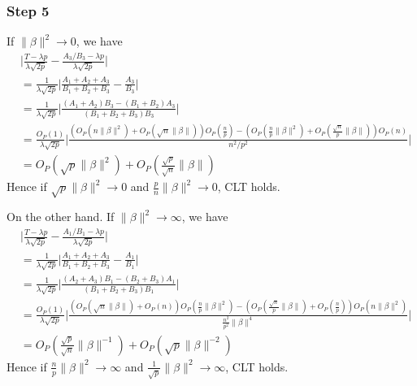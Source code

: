 \documentclass[review]{elsarticle}
\theoremstyle{plain}
\theoremstyle{definition}
\theoremstyle{remark}
\begin{document}
\subsubsection{Step 5}

If $\|\beta\|^2\to 0$, we have
\begin{equation}
    \begin{aligned}
        &\Big|\frac{T-{\lambda p}}{\lambda\sqrt{2p}
        }-
    \frac{A_3/B_3-{\lambda p}}{\lambda\sqrt{2p}
        }\Big|\\
        &=
        \frac{1}{\lambda\sqrt{2p}}
        \Big|
        \frac{A_1+A_2+A_3}{B_1+B_2+B_3}-\frac{A_3}{B_3}
        \Big|\\
        &=
        \frac{1}{\lambda\sqrt{2p}}
        \Big|
        \frac{(A_1+A_2)B_3-(B_1+B_2)A_3}{(B_1+B_2+B_3)B_3}
        \Big|\\
        &=
        \frac{O_{P}(1)}{\lambda\sqrt{2p}}
        \Big|
        \frac{(O_P(n\|\beta\|^2)+O_P(\sqrt{n}\|\beta\|))O_P(\frac{n}{p})-(O_P(\frac{n}{p}\|\beta\|^2)+O_P(\frac{\sqrt{n}}{p}\|\beta\|))O_P(n)}{n^2/p^2}
        \Big|\\
        &=O_P(\sqrt{p}\|\beta\|^2)+O_P(\frac{\sqrt{p}}{\sqrt{n}}\|\beta\|)
    \end{aligned}
\end{equation}
Hence if $\sqrt{p}\|\beta\|^2\to 0$ and $\frac{p}{n}\|\beta\|^2\to 0$, CLT holds.

On the other hand. If $\|\beta\|^2\to \infty$, we have
\begin{equation}
    \begin{aligned}
        &\Big|\frac{T-{\lambda p}}{\lambda\sqrt{2p}
        }-
    \frac{{A_1}/{B_1}-{\lambda p}}{\lambda\sqrt{2p}
        }\Big|\\
        &=
        \frac{1}{\lambda\sqrt{2p}}
        \Big|
        \frac{A_1+A_2+A_3}{B_1+B_2+B_3}-\frac{A_1}{B_1}
        \Big|\\
        &=
        \frac{1}{\lambda\sqrt{2p}}
        \Big|
        \frac{(A_2+A_3)B_1-(B_2+B_3)A_1}{(B_1+B_2+B_3)B_1}
        \Big|\\
        &=
        \frac{O_{P}(1)}{\lambda\sqrt{2p}}
        \Big|
        \frac{(O_P(\sqrt{n}\|\beta\|)+O_P(n))O_P(\frac{n}{p}\|\beta\|^2)-(O_P(\frac{\sqrt{n}}{p}\|\beta\|)+O_P(\frac{n}{p}))O_P(n\|\beta\|^2)}{\frac{n^2}{p^2}\|\beta\|^4}
        \Big|\\
        &=O_P(\frac{\sqrt{p}}{\sqrt{n}}\|\beta\|^{-1})+O_P(\sqrt{p}\|\beta\|^{-2})
    \end{aligned}
\end{equation}
Hence if $\frac{n}{p}\|\beta\|^2\to \infty$ and $\frac{1}{\sqrt{p}}\|\beta\|^2\to \infty$, CLT holds.
\end{document}
